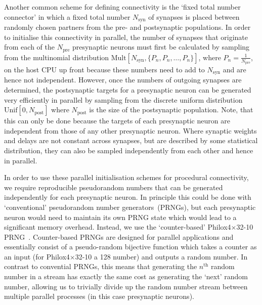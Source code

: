 \documentclass[9pt,a4paper]{amsart}
\newcommand{\todo}[1]{\textbf{\textsc{\textcolor{red}{(TODO: #1)}}}}
\begin{document}
Another common scheme for defining connectivity is the `fixed total number connector' in which a fixed total number $N_{\text{syn}}$ of synapses is placed between randomly chosen partners from the pre- and postsynaptic populations.
In order to initialise this connectivity in parallel, the number of synapses that originate from each of the $N_{\text{pre}}$ presynaptic neurons must first be calculated by sampling from the multinomial distribution $\text{Mult}[N_{\text{syn}}, \{P_{n}, P_{n}, \ldots, P_{n}\}]$, where $P_{n} = \frac{1}{N_{\text{pre}}}$, on the host CPU up front because these numbers need to add to $N_{\text{syn}}$ and are hence not independent.
However, once the numbers of outgoing synapses are determined, the postsynaptic targets for a presynaptic neuron can be generated very efficiently in parallel by sampling from the discrete uniform distribution $\text{Unif}[0, N_{\text{post}}]$ where $N_{\text{post}}$ is the size of the postsynaptic population.
Note, that this can only be done because the targets of each presynaptic neuron are independent from those of any other presynaptic neuron.
Where synaptic weights and delays are not constant across synapses, but are described by some statistical distribution, they can also be sampled independently from each other and hence in parallel.
%

In order to use these parallel initialisation schemes for procedural connectivity, we require reproducible pseudorandom numbers that can be generated independently for each presynaptic neuron.
In principle this could be done with `conventional' pseudorandom  number generators~(PRNGs), but each presynaptic neuron would need to maintain its own PRNG state which would lead to a significant memory overhead.
Instead, we use the `counter-based' Philox4$\times$32-10 PRNG~\citep{Salmon2011}.
Counter-based PRNGs are designed for parallel applications and essentially consist of a pseudo-random bijective function which takes a counter as an input (for Philox4$\times$32-10 a \SI{128}{\bit} number) and outputs a random number.
In contrast to convential PRNGs, this means that generating the $n^\text{th}$ random number in a stream has exactly the same cost as generating the `next' random number, allowing us to trivially divide up the random number stream between multiple parallel processes (in this case presynaptic neurons).
\end{document}
